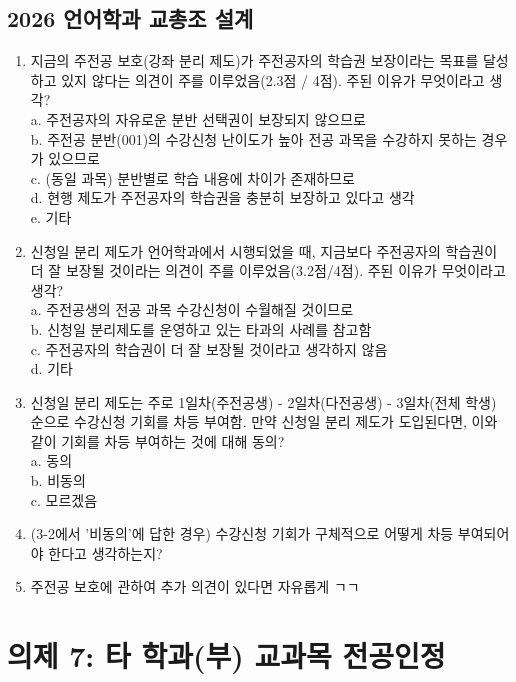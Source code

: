 \documentclass{oblivoir}
\begin{document}
\subsection{2026 언어학과 교총조 설계}
\begin{enumerate}
    \item [3-1] 지금의 주전공 보호(강좌 분리 제도)가 주전공자의 학습권 보장이라는 목표를 달성하고 있지 않다는 의견이 주를 이루었음(2.3점 / 4점). 주된 이유가 무엇이라고 생각? \\ a. 주전공자의 자유로운 분반 선택권이 보장되지 않으므로 \\ b. 주전공 분반(001)의 수강신청 난이도가 높아 전공 과목을 수강하지 못하는 경우가 있으므로 \\ c. (동일 과목) 분반별로 학습 내용에 차이가 존재하므로 \\ d. 현행 제도가 주전공자의 학습권을 충분히 보장하고 있다고 생각 \\ e. 기타
    \item [3-2] 신청일 분리 제도가 언어학과에서 시행되었을 때, 지금보다 주전공자의 학습권이 더 잘 보장될 것이라는 의견이 주를 이루었음(3.2점/4점). 주된 이유가 무엇이라고 생각? \\ a. 주전공생의 전공 과목 수강신청이 수월해질 것이므로 \\ b. 신청일 분리제도를 운영하고 있는 타과의 사례를 참고함 \\ c. 주전공자의 학습권이 더 잘 보장될 것이라고 생각하지 않음 \\ d. 기타
    \item [3-3] 신청일 분리 제도는 주로 1일차(주전공생) - 2일차(다전공생) - 3일차(전체 학생) 순으로 수강신청 기회를 차등 부여함. 만약 신청일 분리 제도가 도입된다면, 이와 같이 기회를 차등 부여하는 것에 대해 동의? \\ a. 동의 \\ b. 비동의 \\ c. 모르겠음
    \item [3-4] (3-2에서 '비동의'에 답한 경우) 수강신청 기회가 구체적으로 어떻게 차등 부여되어야 한다고 생각하는지?
    \item [3-5] 주전공 보호에 관하여 추가 의견이 있다면 자유롭게 ㄱㄱ
\end{enumerate}

\newpage
\section{의제 7: 타 학과(부) 교과목 전공인정}
\end{document}
